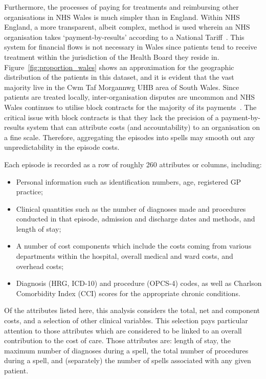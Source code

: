 Furthermore, the processes of paying for treatments and reimbursing other
organisations in NHS Wales is much simpler than in England. Within NHS England,
a more transparent, albeit complex, method is used wherein an NHS organisation
takes `payment-by-results' according to a National Tariff~\cite{BMA2020,UK2011}.
This system for financial flows is not necessary in Wales since patients tend to
receive treatment within the jurisdiction of the Health Board they reside in.
Figure~\ref{fig:proportion_wales} shows an approximation for the geographic
distribution of the patients in this dataset, and it is evident that the vast
majority live in the Cwm Taf Morgannwg UHB area of South Wales. Since patients
are treated locally, inter-organisation disputes are uncommon and NHS Wales
continues to utilise block contracts for the majority of its
payments~\cite{BMA2020}. The critical issue with block contracts is that they
lack the precision of a payment-by-results system that can attribute costs (and
accountability) to an organisation on a fine scale. Therefore, aggregating the
episodes into spells may smooth out any unpredictability in the episode costs.

Each episode is recorded as a row of roughly 260 attributes or columns,
including:
\begin{itemize}
    \item Personal information such as identification numbers, age, registered
        GP practice;
    \item Clinical quantities such as the number of diagnoses made and
        procedures conducted in that episode, admission and discharge dates and
        methods, and length of stay;
    \item A number of cost components which include the costs coming from
        various departments within the hospital, overall medical and ward costs,
        and overhead costs;
    \item Diagnosis (HRG, ICD-10) and procedure (OPCS-4) codes, as well as
        Charlson Comorbidity Index (CCI) scores for the appropriate chronic
        conditions.
\end{itemize}

Of the attributes listed here, this analysis considers the total, net and
component costs, and a selection of other clinical variables. This selection
pays particular attention to those attributes which are considered to be linked
to an overall contribution to the cost of care. Those attributes are: length of
stay, the maximum number of diagnoses during a spell, the total number of
procedures during a spell, and (separately) the number of spells associated with
any given patient.


